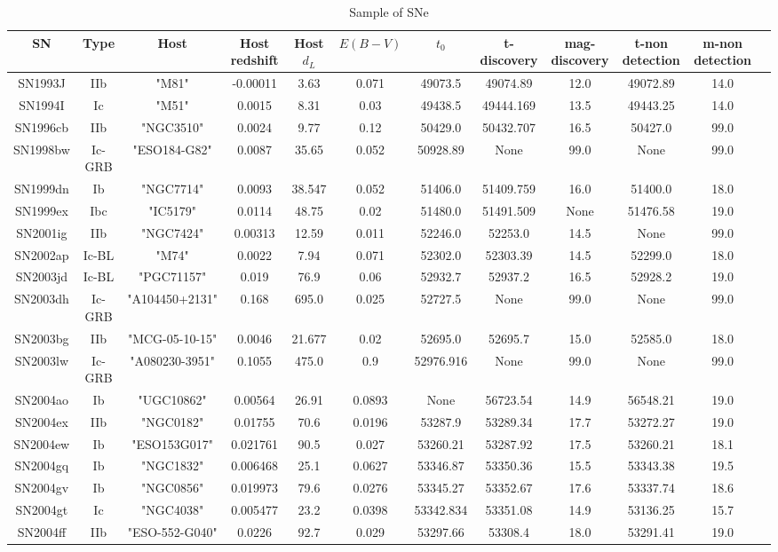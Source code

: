 \documentclass[onecolumn]{aa} %
\begin{document}
\begin{table*}
\centering
\scriptsize
\caption{Sample of SNe\label{tab:table}}
\begin{tabular}{cccccccccccc}
\hline
{SN}&{Type}&{Host}&{Host redshift}&{Host $d_L$}&{$E(B-V)$}&{$t_0$}&{t-discovery}&{mag-discovery}&{t-non detection}&{m-non detection}\\
\hline
SN1993J&IIb&"M81"&-0.00011&3.63&0.071&49073.5&49074.89&12.0&49072.89&14.0\\ 
SN1994I&Ic&"M51"&0.0015&8.31&0.03&49438.5&49444.169&13.5&49443.25&14.0\\ 
SN1996cb&IIb&"NGC3510"&0.0024&9.77&0.12&50429.0&50432.707&16.5&50427.0&99.0\\ 
SN1998bw&Ic-GRB&"ESO184-G82"&0.0087&35.65&0.052&50928.89&None&99.0&None&99.0\\ 
SN1999dn&Ib&"NGC7714"&0.0093&38.547&0.052&51406.0&51409.759&16.0&51400.0&18.0\\ 
SN1999ex&Ibc&"IC5179"&0.0114&48.75&0.02&51480.0&51491.509&None&51476.58&19.0\\ 
SN2001ig&IIb&"NGC7424"&0.00313&12.59&0.011&52246.0&52253.0&14.5&None&99.0\\ 
SN2002ap&Ic-BL&"M74"&0.0022&7.94&0.071&52302.0&52303.39&14.5&52299.0&18.0\\ 
SN2003jd&Ic-BL&"PGC71157"&0.019&76.9&0.06&52932.7&52937.2&16.5&52928.2&19.0\\ 
SN2003dh&Ic-GRB&"A104450+2131"&0.168&695.0&0.025&52727.5&None&99.0&None&99.0\\ 
SN2003bg&IIb&"MCG-05-10-15"&0.0046&21.677&0.02&52695.0&52695.7&15.0&52585.0&18.0\\ 
SN2003lw&Ic-GRB&"A080230-3951"&0.1055&475.0&0.9&52976.916&None&99.0&None&99.0\\ 
SN2004ao&Ib&"UGC10862"&0.00564&26.91&0.0893&None&56723.54&14.9&56548.21&19.0\\ 
SN2004ex&IIb&"NGC0182"&0.01755&70.6&0.0196&53287.9&53289.34&17.7&53272.27&19.0\\ 
SN2004ew&Ib&"ESO153G017"&0.021761&90.5&0.027&53260.21&53287.92&17.5&53260.21&18.1\\ 
SN2004gq&Ib&"NGC1832"&0.006468&25.1&0.0627&53346.87&53350.36&15.5&53343.38&19.5\\ 
SN2004gv&Ib&"NGC0856"&0.019973&79.6&0.0276&53345.27&53352.67&17.6&53337.74&18.6\\ 
SN2004gt&Ic&"NGC4038"&0.005477&23.2&0.0398&53342.834&53351.08&14.9&53136.25&15.7\\ 
SN2004ff&IIb&"ESO-552-G040"&0.0226&92.7&0.029&53297.66&53308.4&18.0&53291.41&19.0\\ 

\end{tabular}
\end{table*}
\end{document}
